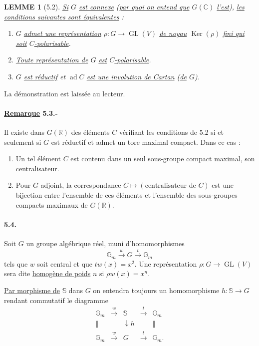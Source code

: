 \documentclass[10pt,leqno]{article}
\newcommand{\C}{\mathbb C}
\newcommand{\R}{\mathbb R}
\newcommand{\bS}{\mathbb S}
\newcommand{\Ker}{\operatorname{Ker}}
\theoremstyle{deligne}
\newtheorem*{lemme}{LEMME}
\newcommand{\ad}{\operatorname{ad}}
\newcommand{\GL}{\operatorname{GL}}
\renewcommand{\underline}[1]{\uline{#1}}
\begin{document}
\begin{lemme}[5.2]
\underline{Si} $G$ \underline{est connexe} (\underline{par quoi on entend que} $G(\C)$ \underline{l'est}), \underline{les conditions suivantes sont équivalentes} :
\begin{enumerate}[label=(\roman*)]
\item $G$ \underline{admet une représentation} $\rho:G\to \GL(V)$ \underline{de noyau} $\Ker(\rho)$ \underline{fini qui soit} $C$\underline{-polarisable}.
\item \underline{Toute représentation de} $G$ \underline{est} $C$\underline{-polarisable}.
\item $G$ \underline{est réductif} et $\ad C$ \underline{est une involution de Cartan} (\underline{de} $G$).
\end{enumerate}
\end{lemme}

La démonstration est laissée au lecteur.

\paragraph{\underline{Remarque} 5.3.-}
Il existe dans $G(\R)$ des éléments $C$ vérifiant les conditions de 5.2 si et seulement si $G$ est réductif et admet un tore maximal compact. Dans ce cas :
\begin{enumerate}[label=\alph*)]
\item Un tel élément $C$ est contenu dans un seul sous-groupe compact maximal, son centralisateur.
\item Pour $G$ adjoint, la correspondance $C\longmapsto (\text{centralisateur de }C)$ est une bijection entre l'ensemble de ces éléments et l'ensemble des sous-groupes compacts maximaux de $G(\R)$.
\end{enumerate}

\paragraph{5.4.}
Soit $G$ un groupe algébrique réel, muni d'homomorphismes
\[
\tag{5.4.1}
 \mathbb G_m \xrightarrow{w} G \xrightarrow{t} \mathbb G_m
\]
tels que $w$ soit central et que $tw(x)=x^2$. Une représentation $\rho:G\to\GL(V)$ sera dite \underline{homogène de poids} $n$ si $\rho w(x)=x^n$.

\underline{Par morphisme de} $\bS$ dans $G$ on entendra toujours un homomorphisme $h:\bS\to G$ rendant commutatif le diagramme
\[
\begin{array}{ccccc}
\mathbb G_m&\xrightarrow{w}&\bS&\xrightarrow{t}&\mathbb G_m\\
\Vert&&\downarrow h&&\Vert\\
\mathbb G_m&\xrightarrow{w}&G&\xrightarrow{t}&\mathbb G_m .
\end{array}
\]
\end{document}

